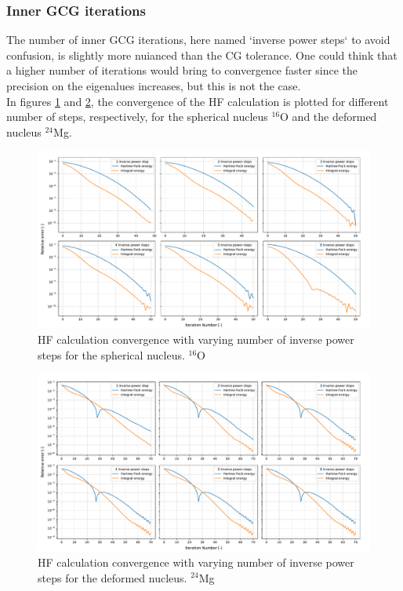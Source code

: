 \subsubsection{Inner GCG iterations}
The number of inner GCG iterations, here named `inverse power steps` to avoid confusion, is slightly more nuianced than the CG tolerance. One could think that a higher number of iterations would bring to convergence faster since the precision on the eigenalues increases, but this is not the case.
\\In figures \ref{fig:conv_steps_o} and \ref{fig:conv_steps_mg}, the convergence of the HF calculation is plotted for different number of steps, respectively, for the spherical nucleus $^{16}$O and the deformed nucleus $^{24}$Mg. 
\begin{figure}[H]
    \centering
    \includegraphics[width=1.0\textwidth]{Images/conv_steps_o.pdf}
    \caption{HF calculation convergence with varying number of inverse power steps for the spherical nucleus. $^{16}$O}
    \label{fig:conv_steps_o}
\end{figure}
\begin{figure}[H]
    \centering
    \includegraphics[width=1.0\textwidth]{Images/conv_steps.pdf}
    \caption{HF calculation convergence with varying number of inverse power steps for the deformed nucleus. $^{24}$Mg}
    \label{fig:conv_steps_mg}
\end{figure}
